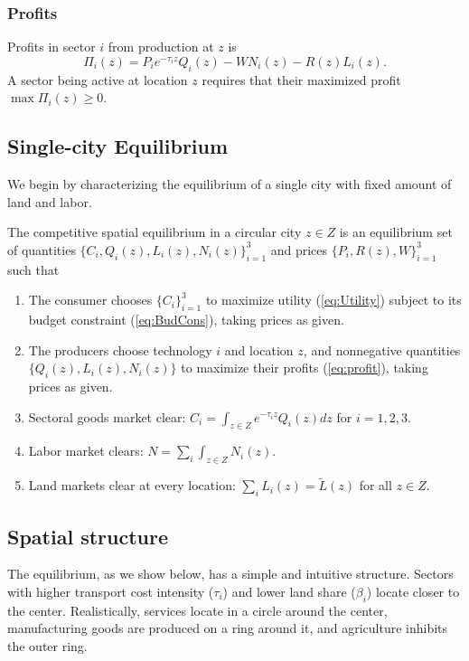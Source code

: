 \documentclass[12pt]{article}
\begin{document}
\subsubsection{Profits}
Profits in sector $i$ from production at $z$ is
\begin{equation}
\label{eq:profit}
\Pi_i(z)=P_ie^{-\tau_iz}Q_i(z)-WN_i(z)-R(z)L_i(z).
\end{equation}
A sector being active at location $z$ requires that their maximized profit $\max\Pi_i(z)\geq0.$

\subsection{Single-city Equilibrium}
We begin by characterizing the equilibrium of a single city with fixed amount of land and labor.

The competitive spatial equilibrium in a circular city $z\in Z$ is an equilibrium set of quantities $\{C_i, Q_i(z), L_i(z), N_i(z)\}_{i=1}^3$ and prices $\{P_i, R(z), W\}_{i=1}^3$ such that
\begin{enumerate}
    \item The consumer chooses $\{C_i\}_{i=1}^3$ to maximize utility (\ref{eq:Utility}) subject to its budget constraint (\ref{eq:BudCons}), taking prices as given.
    \item The producers choose technology $i$ and location $z$, and nonnegative quantities $\{Q_i(z), L_i(z), N_i(z)\}$ to maximize their profits (\ref{eq:profit}), taking prices as given.
    \item Sectoral goods market clear: $C_i=\int_{z\in Z} e^{-\tau_iz}Q_i(z)dz$ for $i=1,2,3$.
    \item Labor market clears: $N=\sum_i\int_{z\in Z} N_i(z)$.
    \item Land markets clear at every location: $\sum_iL_i(z)=\tilde L(z)$ for all $z\in Z$.
\end{enumerate}

\subsection{Spatial structure}
The equilibrium, as we show below, has a simple and intuitive structure. Sectors with higher transport cost intensity ($\tau_i$) and lower land share ($\beta_i$) locate closer to the center. Realistically, services locate in a circle around the center, manufacturing goods are produced on a ring around it, and agriculture inhibits the outer ring.
\end{document}
